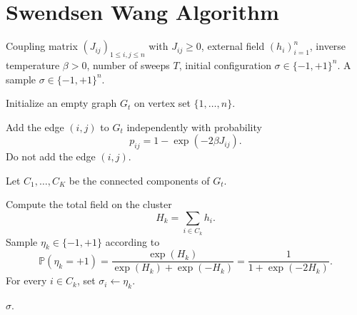 \documentclass[twoside]{article}
\begin{document}
\section{Swendsen Wang Algorithm}
\begin{algorithm}[H]
\caption{Swendsen--Wang algorithm for the Ising model with external field}
\label{algo}
\begin{algorithmic}[1]
\Require Coupling matrix $(J_{ij})_{1 \leq i,j \leq n}$ with $J_{ij}\geq 0$, external field $(h_i)_{i=1}^n$, inverse temperature $\beta>0$, number of sweeps $T$, initial configuration $\sigma \in \{-1,+1\}^n$.
\Ensure A sample $\sigma \in \{-1,+1\}^n$.


    \State Initialize an empty graph $G_t$ on vertex set $\{1,\dots,n\}$.

            \State Add the edge $(i,j)$ to $G_t$ independently with probability
            \[
                p_{ij}=1-\exp(-2\beta J_{ij}).
            \]
        \Else
            \State Do not add the edge $(i,j)$.
        \EndIf
    \EndFor

    \State Let $C_1,\dots,C_K$ be the connected components of $G_t$.

        \State Compute the total field on the cluster
        \[
            H_k=\sum_{i\in C_k} h_i.
        \]
        \State Sample $\eta_k\in\{-1,+1\}$ according to
        \[
            \mathbb{P}(\eta_k=+1)
            =
            \frac{\exp(H_k)}
            {\exp(H_k)+\exp(-H_k)}
            =
            \frac{1}{1+\exp(-2H_k)}.
        \]
        \State For every $i\in C_k$, set $\sigma_i \gets \eta_k$.
    \EndFor

\EndFor

\State \Return $\sigma$.
\end{algorithmic}
\end{algorithm}
\end{document}
